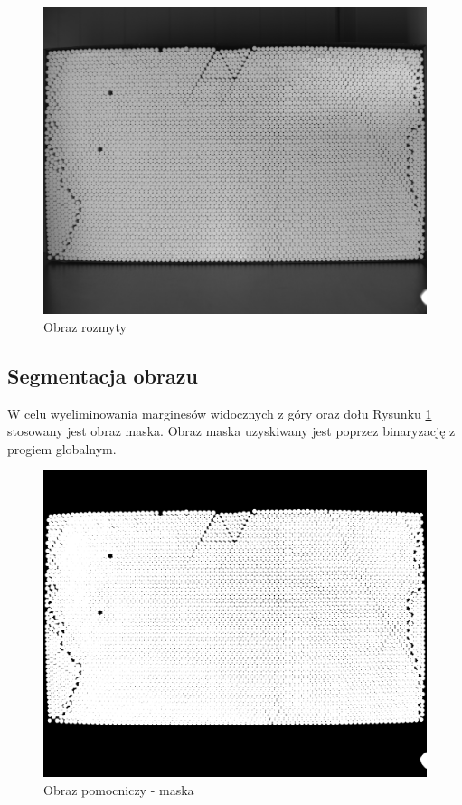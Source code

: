\documentclass[12pt]{article}
\begin{document}
\begin{figure}[H]
\centering \includegraphics[scale=0.108]{step1.png}
\caption{Obraz rozmyty}
\label{blur}
\end{figure}

\subsection{Segmentacja obrazu}

W celu wyeliminowania marginesów widocznych z góry oraz dołu Rysunku \ref{blur} stosowany jest obraz maska. Obraz maska uzyskiwany jest poprzez binaryzację z progiem globalnym.

\begin{figure}[H]
\centering \includegraphics[scale=0.108]{step2.png}
\caption{Obraz pomocniczy - maska}
\label{reduct}
\end{figure}
\end{document}
